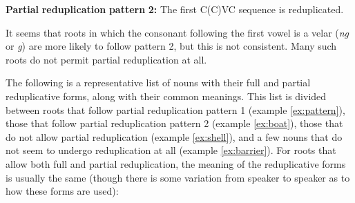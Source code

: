 \textbf{Partial} \textbf{reduplication} \textbf{pattern} \textbf{2:} The first C(C)VC sequence is reduplicated.

It seems that roots in which the consonant following the first vowel is a velar (\textit{ng} or \textit{g}) are more likely to follow pattern 2, but this is not consistent. Many such roots do not permit partial reduplication at all.

The following is a representative list of nouns with their full and partial reduplicative forms, along with their common meanings. This list is divided between roots that follow partial reduplication pattern 1 (example \ref{ex:pattern}), those that follow partial reduplication pattern 2 (example \ref{ex:boat}), those that do not allow partial reduplication (example \ref{ex:shell}), and a few nouns that do not seem to undergo reduplication at all (example \ref{ex:barrier}). For roots that allow both full and partial reduplication, the meaning of the reduplicative forms is usually the same (though there is some variation from speaker to speaker as to how these forms are used):


